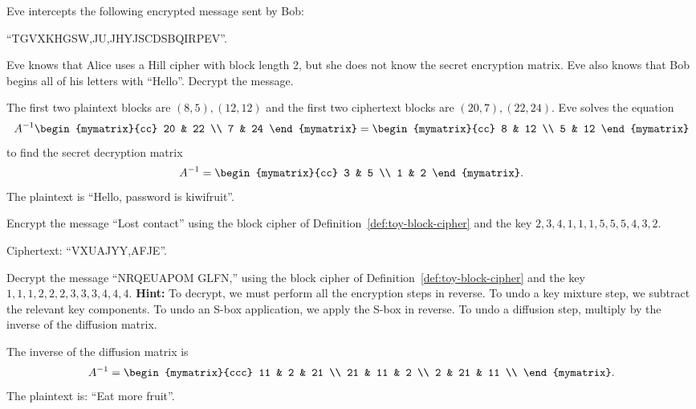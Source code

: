 \begin{ex}
  Eve intercepts the following encrypted message sent by Bob:
  \begin{center}
    ``TGVXKHGSW,JU,JHYJSCDSBQIRPEV''.
  \end{center}
  Eve knows that Alice uses a Hill cipher with block length 2, but she
  does not know the secret encryption matrix. Eve also knows that
  Bob begins all of his letters with ``Hello''. Decrypt the message.
  \begin{sol}
    The first two plaintext blocks are $(8,5),(12,12)$ and the first
    two ciphertext blocks are $(20,7),(22,24)$. Eve solves the equation
    \begin{equation*}
      A^{-1} \begin{mymatrix}{cc} 20 & 22 \\ 7 & 24 \end{mymatrix}
      = \begin{mymatrix}{cc} 8 & 12 \\ 5 & 12 \end{mymatrix}
    \end{equation*}
    to find the secret decryption matrix
    \begin{equation*}
      A^{-1} = \begin{mymatrix}{cc} 3 & 5 \\ 1 & 2 \end{mymatrix}.
    \end{equation*}
    The plaintext is ``Hello, password is kiwifruit''.
  \end{sol}
\end{ex}

\begin{ex}
  Encrypt the message ``Lost contact'' using the block cipher of
  Definition~\ref{def:toy-block-cipher} and the key
  $2,3,4,1,1,1,5,5,5,4,3,2$.
  \begin{sol}
    Ciphertext: ``VXUAJYY,AFJE''.
  \end{sol}
\end{ex}

\begin{ex}
  Decrypt the message ``NRQEUAPOM GLFN,'' using the block cipher of
  Definition~\ref{def:toy-block-cipher} and the key
  $1,1,1,2,2,2,3,3,3,4,4,4$. \textbf{Hint:} To decrypt, we must
  perform all the encryption steps in reverse. To undo a key mixture
  step, we subtract the relevant key components. To undo an S-box
  application, we apply the S-box in reverse. To undo a diffusion
  step, multiply by the inverse of the diffusion matrix.
  \begin{sol}
    The inverse of the diffusion matrix is
    \begin{equation*}
      A^{-1} = \begin{mymatrix}{ccc}
        11 & 2 & 21 \\
        21 & 11 & 2 \\
        2 & 21 & 11 \\
      \end{mymatrix}.
    \end{equation*}
    The plaintext is: ``Eat more fruit''.
  \end{sol}
\end{ex}

